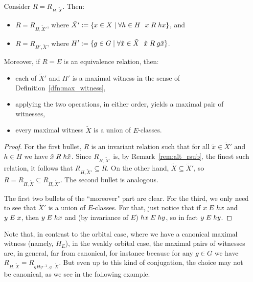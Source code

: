 	\begin{lem}
		\label{lem:worb_maximal}
		Consider $R=R_{H,\tilde X}$. Then:
		\begin{itemize}
			\item
			$R=R_{H,\tilde X'}$, where $\tilde{X'}:=\{x\in X \mid \forall h\in H\ \ x\mathrel{R} hx\}$, and
			\item
			$R=R_{H',\tilde X}$, where $H':=\{g\in G \mid \forall \tilde x\in \tilde X \ \ \tilde x \mathrel{R} g\tilde x \}$.
		\end{itemize}
		
		Moreover, if $R=E$ is an equivalence relation, then:
		\begin{itemize}
			\item
			each of $\tilde X'$ and $H'$ is a maximal witness in the sense of Definition~\ref{dfn:max_witness},
			\item
			applying the two operations, in either order, yields a maximal pair of witnesses,
			\item
			every maximal witness $\tilde X$ is a union of $E$-classes.
		\end{itemize}
	\end{lem}
	\begin{proof}
		For the first bullet, $R$ is an invariant relation such that for all $\tilde x\in \tilde X'$ and $h\in H$ we have $\tilde x \mathrel{R} h\tilde x$. Since $R_{H,\tilde X'}$ is, by Remark~\ref{rem:alt_rsub}, the finest such relation, it follows that $R_{H,\tilde X'}\subseteq R$. On the other hand, $\tilde X\subseteq \tilde X'$, so $R=R_{H,\tilde X}\subseteq R_{H,\tilde X'}$. The second bullet is analogous.
		
		The first two bullets of the ``moreover" part are clear. For the third, we only need to see that $\tilde X'$ is a union of $E$-classes. For that, just notice that if $x\mathrel{E} hx$ and $y\mathrel{E} x$, then $y\mathrel{E} hx$ and (by invariance of $E$) $hx\mathrel{E} hy$, so in fact $y\mathrel{E} hy$.
	\end{proof}
	
	Note that, in contrast to the orbital case, where we have a canonical maximal witness (namely, $H_E$), in the weakly orbital case, the maximal pairs of witnesses are, in general, far from canonical, for instance because for any $g\in G$ we have $R_{H,\tilde X}=R_{gHg^{-1},g\cdot \tilde X}$. But even up to this kind of conjugation, the choice may not be canonical, as we see in the following example.
	
